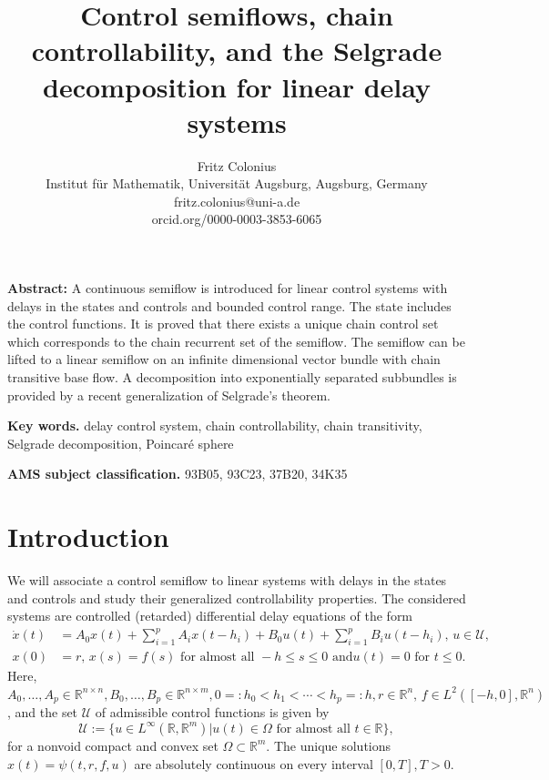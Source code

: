 \documentclass{siamltex}%
\begin{document}
\title{Control semiflows, chain controllability, and the Selgrade decomposition for
linear delay systems}
\author{Fritz Colonius\\Institut f\"{u}r Mathematik, Universit\"{a}t Augsburg, Augsburg, Germany\\fritz.colonius@uni-a.de\\orcid.org/0000-0003-3853-6065}
\maketitle

\textbf{Abstract: }A continuous semiflow is introduced for linear control
systems with delays in the states and controls and bounded control range. The
state includes the control functions. It is proved that there exists a unique
chain control set which corresponds to the chain recurrent set of the
semiflow. The semiflow can be lifted to a linear semiflow on an infinite
dimensional vector bundle with chain transitive base flow. A decomposition
into exponentially separated subbundles is provided by a recent generalization
of Selgrade's theorem.

\textbf{Key words. }delay control system, chain controllability, chain
transitivity, Selgrade decomposition, Poincar\'{e} sphere

\textbf{AMS subject classification.} 93B05, 93C23, 37B20, 34K35

\section{Introduction\label{Section1}}

We will associate a control semiflow to linear systems with delays in the
states and controls and study their generalized controllability properties.
The considered systems are controlled (retarded) differential delay equations
of the form%
\begin{align}
\dot{x}(t)  &  =A_{0}x(t)+\sum_{i=1}^{p}A_{i}x(t-h_{i})+B_{0}u(t)+\sum
_{i=1}^{p}B_{i}u(t-h_{i}),\,u\in\mathcal{U},\label{D1}\\
x(0)  &  =r,\,x(s)=f(s)\text{ for almost all }-h\leq s\leq0\text{ and
}u(t)=0\text{ for }t\leq0.\nonumber
\end{align}
Here, $A_{0},\ldots,A_{p}\in\mathbb{R}^{n\times n},B_{0},\ldots,B_{p}%
\in\mathbb{R}^{n\times m},0=:h_{0}<h_{1}<\cdots<h_{p}=:h,r\in\mathbb{R}%
^{n},\,f\in L^{2}([-h,0],\mathbb{R}^{n})$, and the set $\mathcal{U}$ of
admissible control functions is given by%
\[
\mathcal{U}:=\{u\in L^{\infty}(\mathbb{R},\mathbb{R}^{m})\left\vert
u(t)\in\Omega\text{ for almost all }t\in\mathbb{R}\right.  \},
\]
for a nonvoid compact and convex set $\Omega\subset\mathbb{R}^{m}$. The unique
solutions $x(t)=\psi(t,r,f,u)$ are absolutely continuous on every interval
$[0,T],T>0$.
\end{document}
